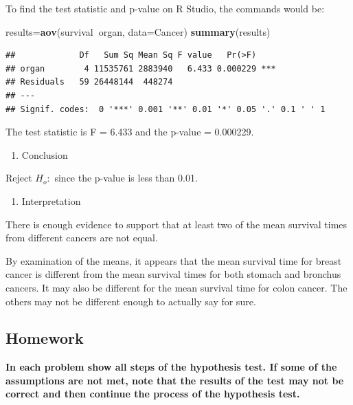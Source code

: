 \documentclass[
]{book}
\newenvironment{Shaded}{\begin{snugshade}}{\end{snugshade}}
\newcommand{\DataTypeTok}[1]{\textcolor[rgb]{0.13,0.29,0.53}{#1}}
\newcommand{\KeywordTok}[1]{\textcolor[rgb]{0.13,0.29,0.53}{\textbf{#1}}}
\newcommand{\NormalTok}[1]{#1}
\newcommand{\OperatorTok}[1]{\textcolor[rgb]{0.81,0.36,0.00}{\textbf{#1}}}
\providecommand{\tightlist}{%
  \setlength{\itemsep}{0pt}\setlength{\parskip}{0pt}}
\begin{document}
To find the test statistic and p-value on R Studio, the commands would be:

\begin{Shaded}
\begin{Highlighting}[]
\NormalTok{results=}\KeywordTok{aov}\NormalTok{(survival}\OperatorTok{~}\NormalTok{organ, }\DataTypeTok{data=}\NormalTok{Cancer)}
\KeywordTok{summary}\NormalTok{(results)}
\end{Highlighting}
\end{Shaded}

\begin{verbatim}
##             Df   Sum Sq Mean Sq F value   Pr(>F)    
## organ        4 11535761 2883940   6.433 0.000229 ***
## Residuals   59 26448144  448274                     
## ---
## Signif. codes:  0 '***' 0.001 '**' 0.01 '*' 0.05 '.' 0.1 ' ' 1
\end{verbatim}

The test statistic is F = 6.433 and the p-value = 0.000229.

\begin{enumerate}
\def\labelenumi{\arabic{enumi}.}
\setcounter{enumi}{4}
\tightlist
\item
  Conclusion
\end{enumerate}

Reject \(H_o:\) since the p-value is less than 0.01.

\begin{enumerate}
\def\labelenumi{\arabic{enumi}.}
\setcounter{enumi}{5}
\tightlist
\item
  Interpretation
\end{enumerate}

There is enough evidence to support that at least two of the mean survival times from different cancers are not equal.

By examination of the means, it appears that the mean survival time for breast cancer is different from the mean survival times for both stomach and bronchus cancers. It may also be different for the mean survival time for colon cancer. The others may not be different enough to actually say for sure.

\hypertarget{homework-30}{%
\subsection{Homework}\label{homework-30}}

\textbf{In each problem show all steps of the hypothesis test. If some of the assumptions are not met, note that the results of the test may not be correct and then continue the process of the hypothesis test.}
\end{document}
